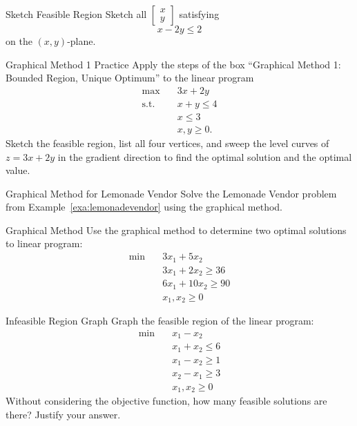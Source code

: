 \begin{ex}{Sketch Feasible Region}{}\label{ex:feasible-region}
Sketch all \(\begin{bmatrix} x \\ y \end{bmatrix}\) satisfying
\[
x - 2y \leq 2
\]
on the \((x,y)\)-plane.
\exrefs{\S\ref{sec:nonempty-bounded}}
\end{ex}

\begin{ex}{Graphical Method 1 Practice}{}\label{ex:graphical-method-one}
Apply the steps of the box ``Graphical Method 1: Bounded Region, Unique Optimum'' to the linear program
\begin{align*}
\max \quad & 3x + 2y\\
\text{s.t.} \quad & x + y \leq 4\\
& x \leq 3\\
& x, y \geq 0.
\end{align*}
Sketch the feasible region, list all four vertices, and sweep the level curves of $z = 3x + 2y$ in the gradient direction to find the optimal solution and the optimal value.
\end{ex}

\begin{ex}{Graphical Method for Lemonade Vendor}{}
Solve the Lemonade Vendor problem from Example~\ref{exa:lemonadevendor} using the graphical method.
\end{ex}


\begin{ex}{Graphical Method}{}
Use the graphical method to determine two optimal solutions to linear program:
\begin{align*}
\min  \quad& 3x_1 + 5x_2\\
 & 3x_1 + 2x_2 \ge 36\\
 & 6x_1 + 10x_2 \geq 90\\
 & x_1, x_2 \geq 0
\end{align*}
\end{ex}

\begin{ex}{Infeasible Region Graph}{}\label{ex:infeasible}
Graph the feasible region of the linear program:
\begin{align*}
\min  \quad & x_1 - x_2\\
 & x_1 + x_2 \leq 6\\
 & x_1 - x_2 \geq 1\\
 & x_2 - x_1 \geq 3\\
 & x_1, x_2 \geq 0
\end{align*}
Without considering the objective function, how many feasible solutions are there?  Justify your answer.
\end{ex}

